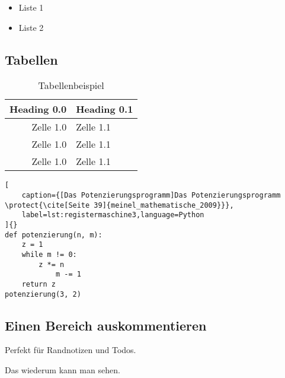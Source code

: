 \begin{itemize}
	\item Liste 1
	\item Liste 2
\end{itemize}

\subsection{Tabellen}

\begin{table}[h!]
  \begin{center}
    \begin{tabular}{ | r | l }
      Heading 0.0  & Heading 0.1\\\hline
      Zelle 1.0  & Zelle 1.1\\
      Zelle 1.0  & Zelle 1.1\\
      Zelle 1.0  & Zelle 1.1\\
      \hline
	\end{tabular}
    \caption[Tabellenbeispiel]{\label{tbl:tabelle}Tabellenbeispiel \cite[Seite 36]{meinel_mathematische_2009}}
  \end{center}
\end{table}

\begin{lstlisting}[
	caption={[Das Potenzierungsprogramm]Das Potenzierungsprogramm \protect{\cite[Seite 39]{meinel_mathematische_2009}}},
	label=lst:registermaschine3,language=Python
]{}
def potenzierung(n, m):
   	z = 1
    while m != 0:
   	    z *= n
        	m -= 1
    return z
potenzierung(3, 2)
\end{lstlisting}

\subsection{Einen Bereich auskommentieren}
Perfekt für Randnotizen und Todos.


Das wiederum kann man sehen.


\fi